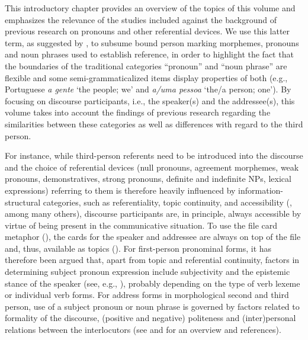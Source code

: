 \documentclass[output=paper]{langscibook}
\begin{document}
This introductory chapter provides an overview of the topics of this volume and emphasizes the relevance of the studies included against the background of previous research on pronouns and other referential devices. We use this latter term, as suggested by \citet{Kibrik2011}, to subsume bound person marking morphemes, pronouns and noun phrases used to establish reference, in order to highlight the fact that the boundaries of the traditional categories “pronoun” and “noun phrase” are flexible and some semi-grammaticalized items display properties of both (e.g., Portuguese \textit{a gente}  ‘the people; we’ and  \textit{a/uma pessoa}  ‘the/a person; one’). By focusing on discourse participants, i.e., the speaker(s) and the addressee(s), this volume takes into account the findings of previous research regarding the similarities between these categories as well as differences with regard to the third person.\largerpage

\begin{sloppypar}
For instance, while third-person referents need to be introduced into the discourse and the choice of referential devices (null pronouns, agreement morphemes, weak pronouns, demonstratives, strong pronouns, definite and indefinite NPs, lexical expressions) referring to them is therefore heavily influenced by in\-for\-ma\-tion-struc\-tur\-al categories, such as referentiality, topic continuity, and accessibility (\citealt{Givón1983, Levinson1987, Ariel1990, GundelZacharski1993}, among many others), discourse participants are, in principle, always accessible by virtue of being present in the communicative situation. To use the file card metaphor (\citealt{Reinhart1981, Heim1982}), the cards for the speaker and addressee are always on top of the file and, thus, available as topics (\citealt[45--46]{Erteschik-Shir2007}). For first-person pronominal forms, it has therefore been argued that, apart from topic and referential continuity, factors in determining subject pronoun expression include subjectivity and the epistemic stance of the speaker (see, e.g., \citealt{Enríquez1984, AijónOlivaSerrano2010, Posio2011, Herbeck2021}), probably depending on the type of verb lexeme or individual verb forms. For address forms in morphological second and third person, use of a subject pronoun or noun phrase is governed by factors related to formality of the discourse, (positive and negative) politeness and (inter)personal relations between the interlocutors (see \citealt{DeJongeNieuwenhuijsen2012} and \citealt{Uber2016} for an overview and references). 
\end{sloppypar}
\end{document}
